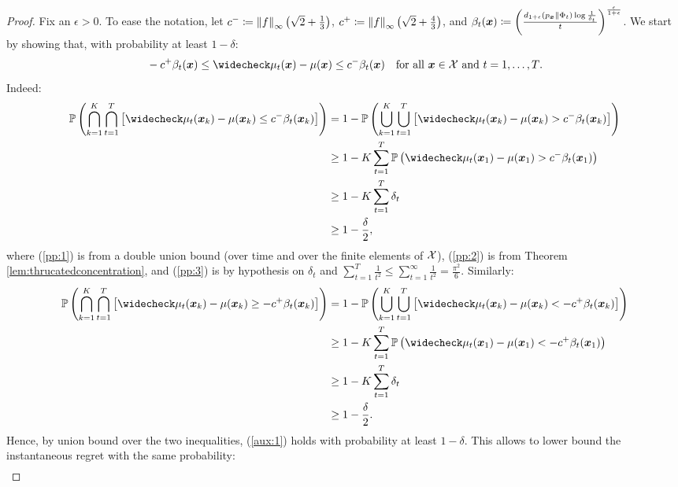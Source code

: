 \documentclass{article}
\begin{document}
\regretdiscrete*
%
\begin{proof}
	Fix an $\epsilon>0$.
	To ease the notation, let $c^{-}\coloneqq \norm[\infty]{f}\left(\sqrt{2}+\frac{1}{3}\right)$, $c^{+}\coloneqq \norm[\infty]{f}\left(\sqrt{2}+\frac{4}{3}\right)$, and $\beta_t(\vx) \coloneqq \left(\frac{d_{1+\epsilon}(p_{\vx}\|\Phi_t)\log\frac{1}{\delta_t}}{t}\right)^{\frac{\epsilon}{1+\epsilon}}$.
	We start by showing that, with probability at least $1-\delta$:
	\begin{align}\label{aux:1}
		&-c^{+}\beta_t({\vx})\leq \wc{\mu_t}(\vx) - \mu(\vx) \leq c^{-}\beta_t(\vx) & \text{for all $\vx\in\Xspace$ and $t=1,\dots,T$}.
	\end{align}
	Indeed:
	\begin{align}
		\Prob\left(\bigcap_{k=1}^{K}\bigcap_{t=1}^T\left[\wc{\mu_t}(\vx_k) - \mu(\vx_k) \leq c^{-}\beta_t(\vx_k)\right]\right) &=1-\Prob\left(\bigcup_{k=1}^{K}\bigcup_{t=1}^T\left[\wc{\mu_t}(\vx_k) - \mu(\vx_k) > c^{-}\beta_t(\vx_k)\right]\right)\nonumber\\
		&\geq 1-K\sum_{t=1}^{T}\Prob\left(\wc{\mu_t}(\vx_1) - \mu(\vx_1) > c^{-}\beta_t(\vx_1)\right) \label{pp:1}\\
		& \geq 1 - K\sum_{t=1}^{T}\delta_t\label{pp:2}\\
		& \geq 1 - \frac{\delta}{2},\label{pp:3}
	\end{align}
	where (\ref{pp:1}) is from a double union bound (over time and over the finite elements of $\Xspace$), (\ref{pp:2}) is from Theorem \ref{lem:thrucatedconcentration}, and (\ref{pp:3}) is by hypothesis on $\delta_t$ and $\sum_{t=1}^{T}\frac{1}{t^2}\leq\sum_{t=1}^{\infty}\frac{1}{t^2} = \frac{\pi^2}{6}$. Similarly:
	\begin{align*}
		\Prob\left(\bigcap_{k=1}^{K}\bigcap_{t=1}^T\left[\wc{\mu_t}(\vx_k) - \mu(\vx_k) \geq -c^{+}\beta_t(\vx_k)\right]\right) &=1-\Prob\left(\bigcup_{k=1}^{K}\bigcup_{t=1}^T\left[\wc{\mu_t}(\vx_k) - \mu(\vx_k) < -c^{+}\beta_t(\vx_k)\right]\right)\nonumber\\
		&\geq 1-K\sum_{t=1}^{T}\Prob\left(\wc{\mu_t}(\vx_1) - \mu(\vx_1) < -c^{+}\beta_t(\vx_1)\right)\\
		&\geq 1 - K\sum_{t=1}^{T}\delta_t\\
		 &\geq 1 - \frac{\delta}{2}.
	\end{align*}
	Hence, by union bound over the two inequalities, (\ref{aux:1}) holds with probability at least $1-\delta$.
	This allows to lower bound the instantaneous regret with the same probability:
	\begin{align}

\end{align}
\end{proof}
\end{document}
